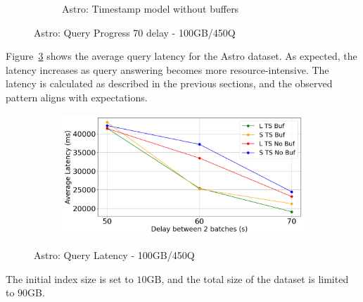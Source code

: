 \begin{figure}
\begin{subfigure}[c]{0.48\textwidth}
		\caption{Astro: Timestamp model without buffers}
		\label{fig:system-ts-no-70-astro}
	\end{subfigure}
	\caption{Astro: Query Progress 70 delay - 100GB/450Q}
	\label{fig:query-progress-70-astro}
\end{figure}

%
Figure~\ref{fig:query-latency} shows the average query latency for the
Astro dataset. As expected, the latency increases as query answering
becomes more resource-intensive. The latency is calculated as described
in the previous sections, and the observed pattern aligns with expectations.

\begin{figure}
	\centering
	\begin{subfigure}[c]{0.6\textwidth}
		\includegraphics[width=1\textwidth]   {figures/Experiments/Dynamic/ASTRO/average_latency_ASTRO.png}
	\end{subfigure}
	\caption{Astro: Query Latency - 100GB/450Q}
	\label{fig:query-latency}
\end{figure}

The initial index size is set to $10$GB, and the total size of the
dataset is limited to  $90$GB.
 
